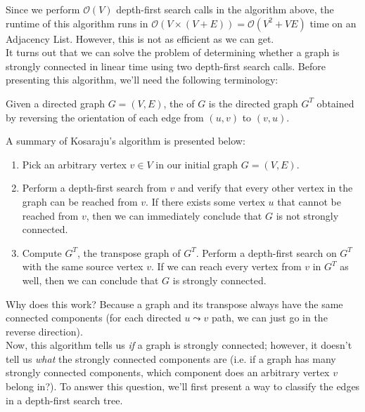 Since we perform $\mathcal{O}(V)$ depth-first search calls in the algorithm above, the runtime of this algorithm runs in $\mathcal{O}(V \times (V + E)) = \mathcal{O}(V^2 + VE)$ time on an Adjacency List. However, this is not as efficient as we can get. \\


It turns out that we can solve the problem of determining whether a graph is strongly connected in linear time using two depth-first search calls. Before presenting this algorithm, we'll need the following terminology:

\begin{definition}
Given a directed graph $G = (V, E)$, the  of $G$ is the directed graph $G^{T}$ obtained by reversing the orientation of each edge from $(u, v)$  to $(v, u)$. 
\end{definition}


A summary of Kosaraju's algorithm is presented below:

\begin{enumerate}
    \item Pick an arbitrary vertex $v \in V$ in our initial graph $G = (V, E)$. 
    \item Perform a depth-first search from $v$ and verify that every other vertex in the graph can be reached from $v$. If there exists some vertex $u$ that cannot be reached from $v$, then we can immediately conclude that $G$ is not strongly connected.
    \item Compute $G^{T}$, the transpose graph of $G^{T}$. Perform a depth-first search on $G^{T}$ with the same source vertex $v$. If we can reach every vertex from $v$ in $G^{T}$ as well, then we can conclude that $G$ is strongly connected.
\end{enumerate}


Why does this work? Because a graph and its transpose always have the same connected components (for each directed $u\leadsto v$ path, we can just go in the reverse direction). \\



Now, this algorithm tells us \textit{if} a graph is strongly connected; however, it doesn't tell us \textit{what} the strongly connected components are (i.e. if a graph has many strongly connected components, which component does an arbitrary vertex $v$ belong in?). To answer this question, we'll first present a way to classify the edges in a depth-first search tree. \\


